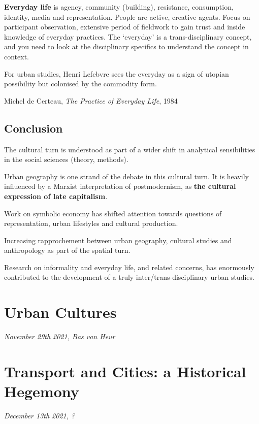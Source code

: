 \documentclass{article}
\begin{document}
\textbf{Everyday life} is agency, community (building), resistance, consumption, identity, media and representation.
People are active, creative agents. Focus on participant observation, extensive period of fieldwork to gain trust and inside knowledge of everyday practices.
The `everyday' is a trans-disciplinary concept, and you need to look at the disciplinary specifics to understand the concept in context. 

For urban studies, Henri Lefebvre sees the everyday as a sign of utopian possibility but colonised by the commodity form.

Michel de Certeau, \textit{The Practice of Everyday Life}, 1984

\subsection{Conclusion}

The cultural turn is understood as part of a wider shift in analytical sensibilities in the social sciences (theory, methods).

Urban geography is one strand of the debate in this cultural turn. It is heavily influenced by a Marxist interpretation of postmodernism, as \textbf{the cultural expression of late capitalism}.

Work on symbolic economy has shifted attention towards questions of representation, urban lifestyles and cultural production. 

Increasing rapprochement between urban geography, cultural studies and anthropology as part of the spatial turn.

Research on informality and everyday life, and related concerns, has enormously contributed to the development of a truly inter/trans-disciplinary urban studies.


\section{Urban Cultures}
\textit{November 29th 2021, Bas van Heur}


\section{Transport and Cities: a Historical Hegemony}
\textit{December 13th 2021, ?}
\end{document}
